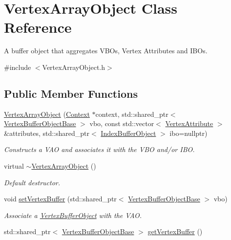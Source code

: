 \hypertarget{class_vertex_array_object}{}\section{Vertex\+Array\+Object Class Reference}
\label{class_vertex_array_object}


A buffer object that aggregates V\+B\+Os, Vertex Attributes and I\+B\+Os.  




{\ttfamily \#include $<$Vertex\+Array\+Object.\+h$>$}

\subsection*{Public Member Functions}
\begin{DoxyCompactItemize}
\item 
\hyperlink{class_vertex_array_object_a6fab9649bd299f89f64b8bcc9d6173dd}{Vertex\+Array\+Object} (\hyperlink{class_context}{Context} $\ast$context, std\+::shared\+\_\+ptr$<$ \hyperlink{class_vertex_buffer_object_base}{Vertex\+Buffer\+Object\+Base} $>$ vbo, const std\+::vector$<$ \hyperlink{class_vertex_attribute}{Vertex\+Attribute} $>$ \&attributes, std\+::shared\+\_\+ptr$<$ \hyperlink{class_index_buffer_object}{Index\+Buffer\+Object} $>$ ibo=nullptr)
\begin{DoxyCompactList}\small\item\em Constructs a V\+AO and associates it with the V\+BO and/or I\+BO. \end{DoxyCompactList}\item 
virtual \hyperlink{class_vertex_array_object_a37ca7e8bff292e3f334544dd6ba4ab37}{$\sim$\+Vertex\+Array\+Object} ()
\begin{DoxyCompactList}\small\item\em Default destructor. \end{DoxyCompactList}\item 
void \hyperlink{class_vertex_array_object_aa830fc54932a907bec1858847668734f}{set\+Vertex\+Buffer} (std\+::shared\+\_\+ptr$<$ \hyperlink{class_vertex_buffer_object_base}{Vertex\+Buffer\+Object\+Base} $>$ vbo)
\begin{DoxyCompactList}\small\item\em Associate a \hyperlink{class_vertex_buffer_object}{Vertex\+Buffer\+Object} with the V\+AO. \end{DoxyCompactList}\item 
std\+::shared\+\_\+ptr$<$ \hyperlink{class_vertex_buffer_object_base}{Vertex\+Buffer\+Object\+Base} $>$ \hyperlink{class_vertex_array_object_adf92ade27ac0b57911d1dc1b707fc454}{get\+Vertex\+Buffer} ()

\end{DoxyCompactItemize}
